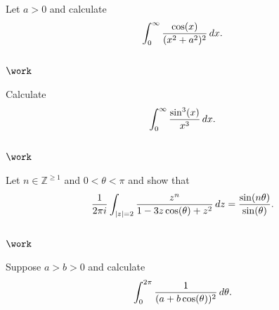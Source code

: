 \begin{problem}[?]

Let \(a>0\) and calculate
\begin{align*}
\int_0^\infty {\cos(x) \over (x^2 + a^2)^2}\, dx
.\end{align*}

\end{problem}

\hypertarget{work-58}{%
\subsection{\texorpdfstring{\(\work\)}{\textbackslash work}}\label{work-58}}

\begin{problem}[?]

Calculate
\begin{align*}
\int_0^\infty {\sin^3(x) \over x^3} \, dx
.\end{align*}

\end{problem}

\hypertarget{work-59}{%
\subsection{\texorpdfstring{\(\work\)}{\textbackslash work}}\label{work-59}}

\begin{problem}[?]

Let \(n\in {\mathbb{Z}}^{\geq 1}\) and \(0<\theta<\pi\) and show that
\begin{align*}
{1\over 2\pi i} \int_{{\left\lvert {z} \right\rvert} = 2} {z^n \over 1 -3z\cos(\theta) + z^2} \,dz = {\sin(n\theta) \over \sin(\theta)}
.\end{align*}

\end{problem}

\hypertarget{work-60}{%
\subsection{\texorpdfstring{\(\work\)}{\textbackslash work}}\label{work-60}}

\begin{problem}[?]

Suppose \(a>b>0\) and calculate
\begin{align*}
\int_0^{2\pi} {1 \over (a+b\cos(\theta))^2} \,d\theta
.\end{align*}

\end{problem}

